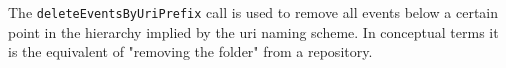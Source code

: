The \verb+deleteEventsByUriPrefix+ call is used to remove all events below a certain
point in the hierarchy implied by the uri naming scheme. In conceptual terms it is
the equivalent of "removing the folder" from a repository.
